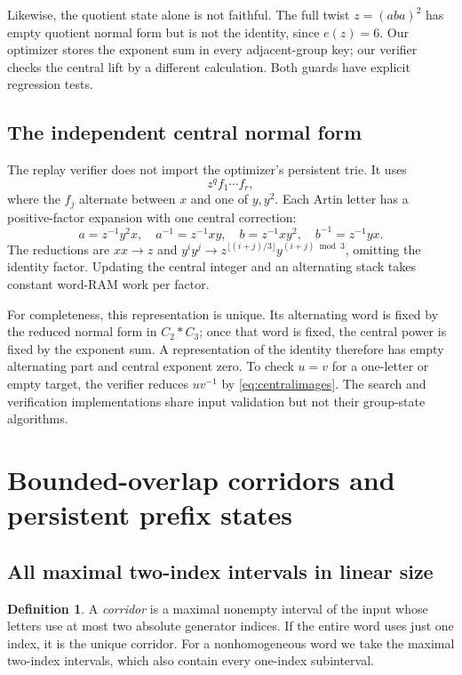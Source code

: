 \documentclass[11pt]{article}
\theoremstyle{definition}
\newtheorem{definition}[theorem]{Definition}
\theoremstyle{remark}
\begin{document}
Likewise, the quotient state alone is not faithful. The full twist
$z=(aba)^2$ has empty quotient normal form but is not the identity, since
$e(z)=6$. Our optimizer stores the exponent sum in every adjacent-group key;
our verifier checks the central lift by a different calculation. Both guards
have explicit regression tests.

\subsection{The independent central normal form}\label{sec:central}
The replay verifier does not import the optimizer's persistent trie. It uses
\[
 z^q f_1\cdots f_r,
\]
where the $f_j$ alternate between $x$ and one of $y,y^2$. Each Artin letter has
a positive-factor expansion with one central correction:
\begin{equation}\label{eq:centralimages}
 a=z^{-1}y^2x,\quad a^{-1}=z^{-1}xy,\quad
 b=z^{-1}xy^2,\quad b^{-1}=z^{-1}yx.
\end{equation}
The reductions are $xx\to z$ and
$y^i y^j\to z^{\lfloor(i+j)/3\rfloor}y^{(i+j)\bmod3}$, omitting the
identity factor. Updating the central integer and an alternating stack takes
constant word-RAM work per factor.

For completeness, this representation is unique. Its alternating word is
fixed by the reduced normal form in $C_2*C_3$; once that word is fixed, the
central power is fixed by the exponent sum. A representation of the identity
therefore has empty alternating part and central exponent zero. To check
$u=v$ for a one-letter or empty target, the verifier reduces $uv^{-1}$ by
\eqref{eq:centralimages}. The search and verification implementations share
input validation but not their group-state algorithms.

\section{Bounded-overlap corridors and persistent prefix states}
\subsection{All maximal two-index intervals in linear size}
\begin{definition}
A \emph{corridor} is a maximal nonempty interval of the input whose letters
use at most two absolute generator indices. If the entire word uses just one
index, it is the unique corridor. For a nonhomogeneous word we take the
maximal two-index intervals, which also contain every one-index subinterval.
\end{definition}
\end{document}
